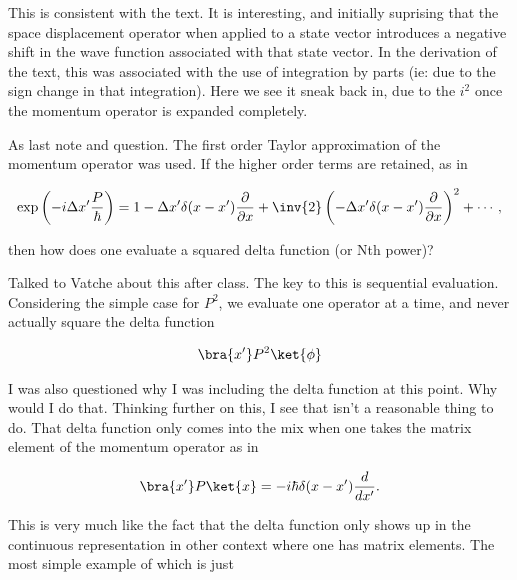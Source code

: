 This is consistent with the text.  It is interesting, and initially suprising that the space displacement operator when applied to a state vector introduces a negative shift in the wave function associated with that state vector.  In the derivation of the text, this was associated with the use of integration by parts (ie: due to the sign change in that integration).  Here we see it sneak back in, due to the $i^2$ once the momentum operator is expanded completely.

As last note and question.  The first order Taylor approximation of the momentum operator was used.  If the higher order terms are retained, as in

\begin{align*}
\exp\left( -i \Delta x' \frac{P}{\hbar} \right) = 
1 - \Delta x' \delta(x -x') \frac{\partial}{\partial x} + 
\inv{2} \left( - \Delta x' \delta(x -x') \frac{\partial}{\partial x} \right)^2 + \cdots,
\end{align*}

then how does one evaluate a squared delta function (or Nth power)?

Talked to Vatche about this after class.  The key to this is sequential evaluation.  Considering the simple case for $P^2$, we evaluate one operator at a time, and never actually square the delta function

\begin{align*}
\bra{x'} P^2 \ket{\phi} 
\end{align*}

I was also questioned why I was including the delta function at this point.  Why would I do that.  Thinking further on this, I see that isn't a reasonable thing to do.  That delta function only comes into the mix when one takes the matrix element of the momentum operator as in

\begin{align*}
\bra{x'} P \ket{x} = -i \hbar \delta(x-x') \frac{d}{dx'}. 
\end{align*}

This is very much like the fact that the delta function only shows up in the continuous representation in other context where one has matrix elements.  The most simple example of which is just

